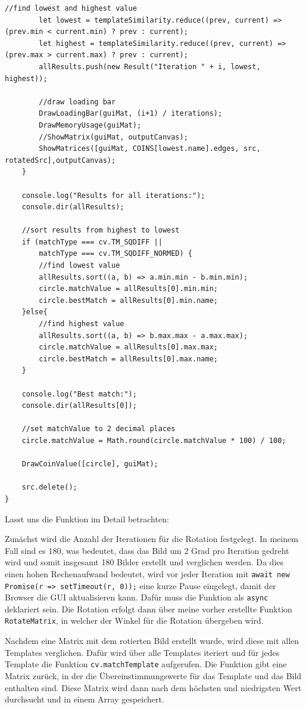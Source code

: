 \begin{lstlisting}[style=JavaScript]
        //find lowest and highest value
        let lowest = templateSimilarity.reduce((prev, current) => (prev.min < current.min) ? prev : current);
        let highest = templateSimilarity.reduce((prev, current) => (prev.max > current.max) ? prev : current);
        allResults.push(new Result("Iteration " + i, lowest, highest));

        //draw loading bar
        DrawLoadingBar(guiMat, (i+1) / iterations);
        DrawMemoryUsage(guiMat);
        //ShowMatrix(guiMat, outputCanvas);
        ShowMatrices([guiMat, COINS[lowest.name].edges, src, rotatedSrc],outputCanvas);
    }

    console.log("Results for all iterations:");
    console.dir(allResults);

    //sort results from highest to lowest
    if (matchType === cv.TM_SQDIFF ||
        matchType === cv.TM_SQDIFF_NORMED) {
        //find lowest value
        allResults.sort((a, b) => a.min.min - b.min.min);
        circle.matchValue = allResults[0].min.min;
        circle.bestMatch = allResults[0].min.name;
    }else{
        //find highest value
        allResults.sort((a, b) => b.max.max - a.max.max);
        circle.matchValue = allResults[0].max.max;
        circle.bestMatch = allResults[0].max.name;
    }

    console.log("Best match:");
    console.dir(allResults[0]);

    //set matchValue to 2 decimal places
    circle.matchValue = Math.round(circle.matchValue * 100) / 100;

    DrawCoinValue([circle], guiMat);

    src.delete();
}
\end{lstlisting}

Lasst uns die Funktion im Detail betrachten:

Zunächst wird die Anzahl der Iterationen für die Rotation festgelegt. In meinem Fall sind es 180, was bedeutet, dass das Bild um 2 Grad pro Iteration gedreht wird und somit insgesamt 180 Bilder erstellt und verglichen werden. Da dies einen hohen Rechenaufwand bedeutet, wird vor jeder Iteration mit \texttt{await new Promise(r => setTimeout(r, 0));} eine kurze Pause eingelegt, damit der Browser die GUI aktualisieren kann. Dafür muss die Funktion als \texttt{async} deklariert sein. Die Rotation erfolgt dann über meine vorher erstellte Funktion \texttt{RotateMatrix}, in welcher der Winkel für die Rotation übergeben wird. 

Nachdem eine Matrix mit dem rotierten Bild erstellt wurde, wird diese mit allen Templates verglichen. Dafür wird über alle Templates iteriert und für jedes Template die Funktion \texttt{cv.matchTemplate} aufgerufen. Die Funktion gibt eine Matrix zurück, in der die Übereinstimmungswerte für das Template und das Bild enthalten sind. Diese Matrix wird dann nach dem höchsten und niedrigsten Wert durchsucht und in einem Array gespeichert.

